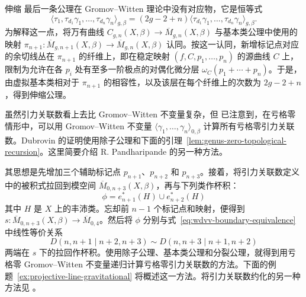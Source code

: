 \begin{axiom*}{伸缩}
最后一条公理在 Gromov--Witten 理论中没有对应物，它是恒等式
\[
\langle\tau_1,\tau_{d_1}\gamma_1,\ldots,\tau_{d_n}\gamma_n\rangle_{g,\beta}
=(2g-2+n)\langle\tau_{d_1}\gamma_1,\ldots,\tau_{d_n}\gamma_n\rangle_{g,\beta}.
\]
为解释这一点，将万有曲线 $C_{g,n}(X,\beta)\to\overline M_{g,n}(X,\beta)$ 与基本类公理中使用的映射 $\pi_{n+1}:\overline M_{g,n+1}(X,\beta)\to\overline M_{g,n}(X,\beta)$ 认同。按这一认同，新增标记点对应的余切线丛在 $\pi_{n+1}$ 的纤维上，即在稳定映射 $(f,C,p_1,\ldots,p_n)$ 的源曲线 $C$ 上，限制为允许在各 $p_i$ 处有至多一阶极点的对偶化微分层 $\omega_C(p_1+\cdots+p_n)$。于是，由虚拟基本类相对于 $\pi_{n+1}$ 的相容性，以及该层在每个纤维上的次数为 $2g-2+n$，得到伸缩公理。
\end{axiom*}

虽然引力关联数看上去比 Gromov--Witten 不变量复杂，但  已注意到，在亏格零情形中，可以用 Gromov--Witten 不变量 $\langle\gamma_1,\ldots,\gamma_n\rangle_{0,\beta}$ 计算所有亏格零引力关联数。Dubrovin 的证明使用除子公理和下面的引理~\ref{lem:genus-zero-topological-recursion}。这里简要介绍 R. Pandharipande 的另一种方法。

其思想是先增加三个辅助标记点 $p_{n+1}$、$p_{n+2}$ 和 $p_{n+3}$。接着，将引力关联数定义中的被积式拉回到模空间 $\overline M_{0,n+3}(X,\beta)$，再与下列类作杯积：
\[
\phi=e_{n+1}^*(H)\cup e_{n+2}^*(H)
\]
其中 $H$ 是 $X$ 上的丰沛类。忘却前 $n-1$ 个标记点和映射，便得到 $s:\overline M_{0,n+3}(X,\beta)\to\overline M_{0,4}$。然后将 $\phi$ 分别与式~\eqref{eq:wdvv-boundary-equivalence} 中线性等价关系
\[
D(n,n+1\mid n+2,n+3)\sim D(n,n+3\mid n+1,n+2)
\]
两端在 $s$ 下的拉回作杯积。使用除子公理、基本类公理和分裂公理，就得到用亏格零 Gromov--Witten 不变量递归计算亏格零引力关联数的方法。下面的例题~\ref{ex:projective-line-gravitational} 将概述这一方法。将引力关联数约化的另一种方法见 。

